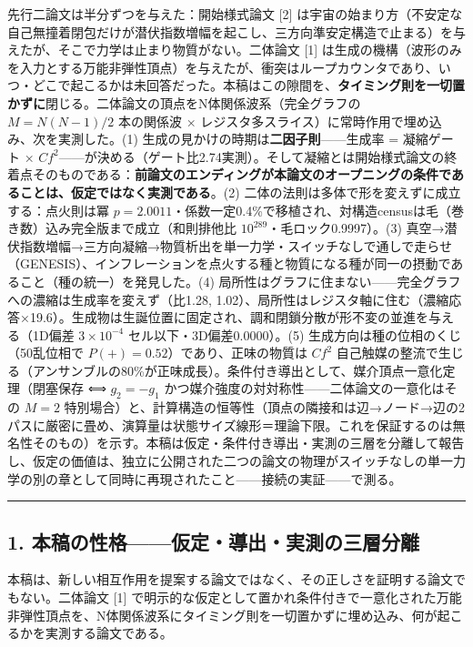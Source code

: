 \documentclass[
  a4paper,
]{ltjsarticle}
\begin{document}
先行二論文は半分ずつを与えた：開始様式論文 {[}2{]}
は宇宙の始まり方（不安定な自己無撞着閉包だけが潜伏指数増幅を起こし、三方向準安定構造で止まる）を与えたが、そこで力学は止まり物質がない。二体論文
{[}1{]}
は生成の機構（波形のみを入力とする万能非弾性頂点）を与えたが、衝突はループカウンタであり、いつ・どこで起こるかは未回答だった。本稿はこの隙間を、\textbf{タイミング則を一切置かずに}閉じる。二体論文の頂点をN体関係波系（完全グラフの
\(M=N(N-1)/2\) 本の関係波 ×
レジスタ多スライス）に常時作用で埋め込み、次を実測した。(1)
生成の見かけの時期は\textbf{二因子則}------生成率 = 凝縮ゲート ×
\(Cf^2\)------が決める（ゲート比2.74実測）。そして凝縮とは開始様式論文の終着点そのものである：\textbf{前論文のエンディングが本論文のオープニングの条件であることは、仮定ではなく実測である}。(2)
二体の法則は多体で形を変えずに成立する：点火則は冪
\(p=2.0011\)・係数一定0.4\%で移植され、対構造censusは毛（巻き数）込み完全版まで成立（和則排他比
\(10^{289}\)・毛ロック0.9997）。(3)
真空→潜伏指数増幅→三方向凝縮→物質析出を単一力学・スイッチなしで通しで走らせ（GENESIS）、インフレーションを点火する種と物質になる種が同一の摂動であること（種の統一）を発見した。(4)
局所性はグラフに住まない------完全グラフへの濃縮は生成率を変えず（比1.28,
1.02）、局所性はレジスタ軸に住む（濃縮応答×19.6）。生成物は生誕位置に固定され、調和閉鎖分散が形不変の並進を与える（1D偏差
\(3\times10^{-4}\) セル以下・3D偏差0.0000）。(5)
生成方向は種の位相のくじ（50乱位相で \(P(+)=0.52\)）であり、正味の物質は
\(Cf^2\)
自己触媒の整流で生じる（アンサンブルの80\%が正味成長）。条件付き導出として、媒介頂点一意化定理（閉塞保存
⟺ \(g_2=-g_1\) かつ媒介強度の対対称性------二体論文の一意化はその
\(M=2\)
特別場合）と、計算構造の恒等性（頂点の隣接和は辺→ノード→辺の2パスに厳密に畳め、演算量は状態サイズ線形＝理論下限。これを保証するのは無名性そのもの）を示す。本稿は仮定・条件付き導出・実測の三層を分離して報告し、仮定の価値は、独立に公開された二つの論文の物理がスイッチなしの単一力学の別の章として同時に再現されたこと------接続の実証------で測る。

\begin{center}\rule{0.5\linewidth}{0.5pt}\end{center}

\subsection{1.
本稿の性格------仮定・導出・実測の三層分離}\label{ux672cux7a3fux306eux6027ux683cux4eeeux5b9aux5c0eux51faux5b9fux6e2cux306eux4e09ux5c64ux5206ux96e2}

本稿は、新しい相互作用を提案する論文ではなく、その正しさを証明する論文でもない。二体論文
{[}1{]}
で明示的な仮定として置かれ条件付きで一意化された万能非弾性頂点を、N体関係波系にタイミング則を一切置かずに埋め込み、何が起こるかを実測する論文である。
\end{document}
